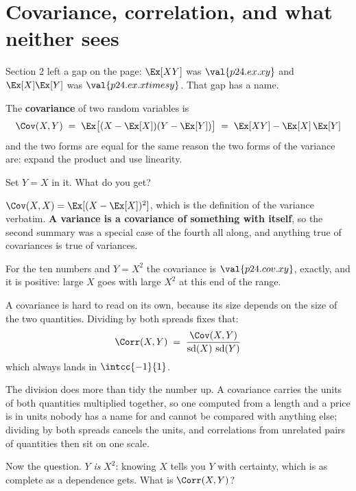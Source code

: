\section{Covariance, correlation, and what neither sees}
\label{sec:P24-covariance}

\begin{fr}
Section 2 left a gap on the page: $\Ex[XY]$ was $\val{p24.ex.xy}$ and
$\Ex[X]\Ex[Y]$ was $\val{p24.ex.xtimesy}$. That gap has a name.

The \textbf{covariance} of two random variables is
\[ \Cov(X, Y) \;=\; \Ex\bigl[(X - \Ex[X])(Y - \Ex[Y])\bigr]
   \;=\; \Ex[XY] - \Ex[X]\,\Ex[Y] \]
and the two forms are equal for the same reason the two forms of the variance
are: expand the product and use linearity.

Set $Y = X$ in it. What do you get?
\dotline
\nextframe
\end{fr}

\begin{fr}

$\Cov(X, X) = \Ex[(X - \Ex[X])^{2}]$, which is the definition of the variance
verbatim. \textbf{A variance is a covariance of something with itself}, so the
second summary was a special case of the fourth all along, and anything true
of covariances is true of variances.

For the ten numbers and $Y = X^{2}$ the covariance is
$\val{p24.cov.xy}$, exactly, and it is positive: large $X$ goes with large
$X^{2}$ at this end of the range.
\end{fr}

\begin{fr}
A covariance is hard to read on its own, because its size depends on the size
of the two quantities. Dividing by both spreads fixes that:
\[ \Corr(X, Y) \;=\; \frac{\Cov(X, Y)}
   {\operatorname{sd}(X)\,\operatorname{sd}(Y)} \]
which always lands in $\intcc{-1}{1}$.

The division does more than tidy the number up. A covariance carries the units
of both quantities multiplied together, so one computed from a length and a
price is in units nobody has a name for and cannot be compared with anything
else; dividing by both spreads cancels the units, and correlations from
unrelated pairs of quantities then sit on one scale.

Now the question. $Y$ \emph{is} $X^{2}$: knowing $X$ tells you $Y$ with
certainty, which is as complete as a dependence gets. What is $\Corr(X, Y)$?
\dotline
\nextframe
\end{fr}

